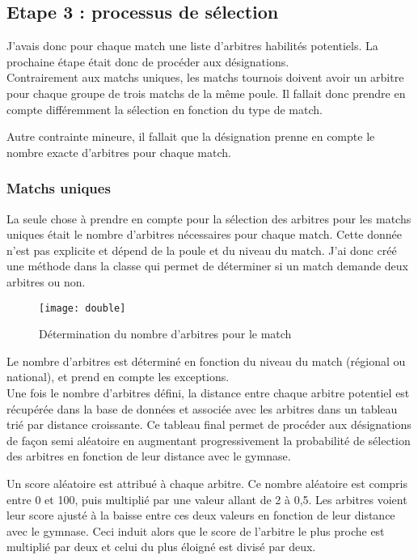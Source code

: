 \subsection{Etape 3 : processus de sélection}
\vspace{1cm}

J’avais donc pour chaque match une liste d’arbitres habilités potentiels. La prochaine étape était donc de procéder aux désignations. \\

Contrairement aux matchs uniques, les matchs tournois doivent avoir un arbitre pour chaque groupe de trois matchs de la même poule. Il fallait donc prendre en compte différemment la sélection en fonction du type de match.

Autre contrainte mineure, il fallait que la désignation prenne en compte le nombre exacte d’arbitres pour chaque match.

\subsubsection{Matchs uniques}
\vspace{1cm}

La seule chose à prendre en compte pour la sélection des arbitres pour les matchs uniques était le nombre d’arbitres nécessaires pour chaque match. Cette donnée n’est pas explicite et dépend de la poule et du niveau du match. 
J’ai donc créé une méthode dans la classe  qui permet de déterminer si un match demande deux arbitres ou non.

\begin{figure}[!h]
    \centering
    \texttt{[image: double]}
    \caption{Détermination du nombre d'arbitres pour le match}
\end{figure}

Le nombre d’arbitres est déterminé en fonction du niveau du match (régional ou national), et prend en compte les exceptions. \\

Une fois le nombre d’arbitres défini, la distance entre chaque arbitre potentiel est récupérée dans la base de données et associée avec les arbitres dans un tableau trié par distance croissante. Ce tableau final permet de procéder aux désignations de façon semi aléatoire en augmentant progressivement la probabilité de sélection des arbitres en fonction de leur distance avec le gymnase.

\begin{commentaire}
Un score aléatoire est attribué à chaque arbitre. Ce nombre aléatoire est compris entre 0 et 100, puis multiplié par une valeur allant de 2 à 0,5. Les arbitres voient leur score ajusté à la baisse entre ces deux valeurs en fonction de leur distance avec le gymnase.
Ceci induit alors que le score de l’arbitre le plus proche est multiplié par deux et celui du plus éloigné est divisé par deux.
\end{commentaire}

